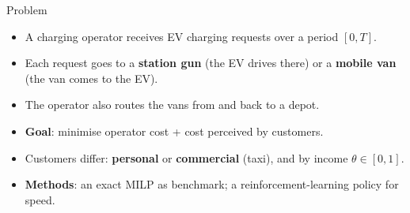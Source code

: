 \documentclass[aspectratio=169,11pt,t]{beamer}
\begin{document}
\begin{frame}{Problem}
\begin{itemize}
  \item A charging operator receives EV charging requests over a period $[0,T]$.
  \item Each request goes to a \textbf{station gun} (the EV drives there) or a \textbf{mobile van} (the van comes to the EV).
  \item The operator also routes the vans from and back to a depot.
  \item \textbf{Goal}: minimise operator cost + cost perceived by customers.
  \item Customers differ: \textbf{personal} or \textbf{commercial} (taxi), and by income $\theta\in[0,1]$.
  \item \textbf{Methods}: an exact MILP as benchmark; a reinforcement-learning policy for speed.
\end{itemize}
\end{frame}
\end{document}
